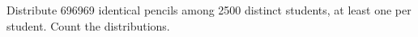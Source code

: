 Distribute 696969 identical pencils among 2500 distinct students, at least one per student. Count the distributions.
